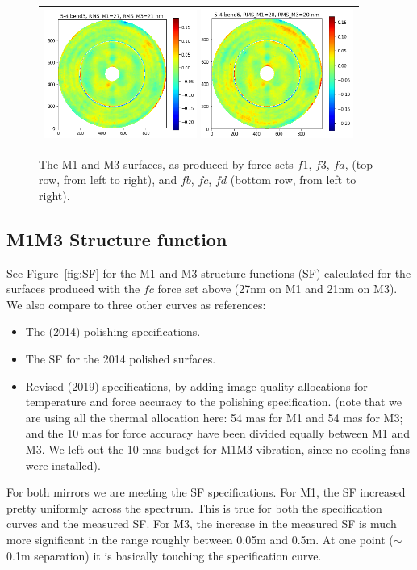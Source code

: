 \documentclass [twoside,openbib,12pt]{article}
\newcommand{\bitm}{\begin{itemize}}
\newcommand{\eitm}{\end{itemize}}
\begin{document}
\begin{figure}[bthp]
\begin{center}
\begin{tabular}{c}
\includegraphics[width=50mm]{figures/optSc.png}
\includegraphics[width=50mm]{figures/optSd.png}

  \end{tabular}
   \end{center}
   \caption
   { \label{fig:optS}
     The M1 and M3 surfaces, as produced by force sets $f1$,
  $f3$, $fa$, (top row, from left to right), and $fb$, $fc$, $fd$
  (bottom row, from left to right).
 }
\end{figure}

 \subsection{M1M3 Structure function}

 See Figure~\ref{fig:SF} for the M1 and M3 structure functions (SF)
 calculated for the surfaces produced with the $fc$ force set above (27nm on M1 and 21nm on M3).
We also compare to three other curves as references:
 \bitm
\item The (2014) polishing specifications.
\item The SF for the 2014 polished surfaces.
  \item Revised (2019) specifications, by adding image quality
    allocations for temperature and force accuracy to the polishing
    specification. (note that we are using all the thermal allocation
    here: 54 mas for M1 and 54 mas for M3; and the 10 mas
    for force accuracy have been divided equally between M1 and M3. We
    left out the 10 mas budget for M1M3 vibration, since no cooling
    fans were installed).
    \eitm
For both mirrors we are meeting the SF specifications.
For M1, the SF increased pretty uniformly across the spectrum. This is true for both the specification curves and the measured SF. For M3, the increase in the measured SF is much more significant in the range roughly between 0.05m and 0.5m. At one point ($\sim$0.1m separation) it is basically touching the specification curve.
\end{document}
